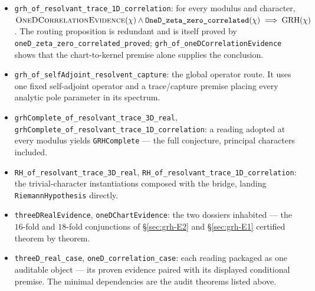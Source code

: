 \begin{itemize}
equality embedded in the legacy premise.
\item \texttt{grh\_of\_resolvant\_trace\_1D\_correlation}: for every modulus
and character, \(\textsc{OneDCorrelationEvidence}(\chi)\wedge
\texttt{OneD\_zeta\_zero\_correlated}(\chi)\implies\mathrm{GRH}(\chi)\).
The routing proposition is redundant and is itself proved by
\texttt{oneD\_zeta\_zero\_correlated\_proved};
\texttt{grh\_of\_oneDCorrelationEvidence} shows that the chart-to-kernel
premise alone supplies the conclusion.
\item \texttt{grh\_of\_selfAdjoint\_resolvent\_capture}: the global operator
route.  It uses one fixed self-adjoint operator and a trace/capture premise
placing every analytic pole parameter in its spectrum.
\item \texttt{grhComplete\_of\_resolvant\_trace\_3D\_real},
\texttt{grhComplete\_of\_resolvant\_trace\_1D\_correlation}: a reading
adopted at every modulus yields \texttt{GRHComplete} --- the full
conjecture, principal characters included.
\item \texttt{RH\_of\_resolvant\_trace\_3D\_real},
\texttt{RH\_of\_resolvant\_trace\_1D\_correlation}: the trivial-character
instantiations composed with the bridge, landing \texttt{RiemannHypothesis}
directly.
\item \texttt{threeDRealEvidence}, \texttt{oneDChartEvidence}: the two
dossiers inhabited --- the \(16\)-fold and \(18\)-fold conjunctions of
\S\ref{sec:grh-E2} and \S\ref{sec:grh-E1} certified theorem by theorem.
\item \texttt{threeD\_real\_case}, \texttt{oneD\_correlation\_case}: each
reading packaged as one auditable object --- its proven evidence paired with
its displayed conditional premise.  The minimal dependencies are the audit
theorems listed above.
\end{itemize}

